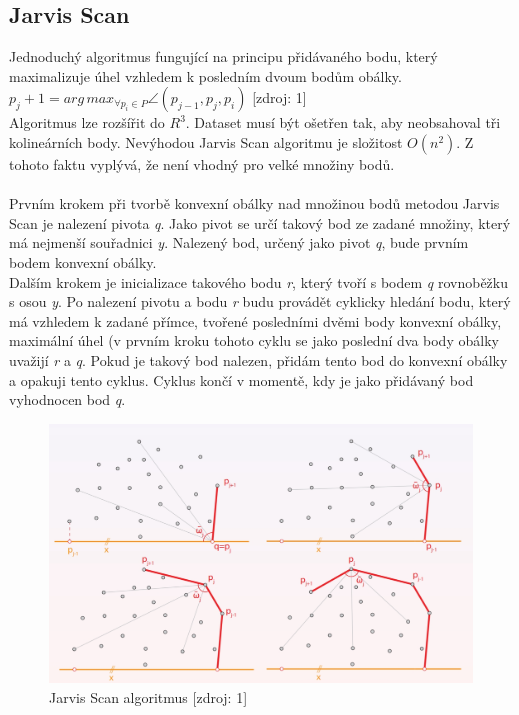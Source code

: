 \documentclass[a4paper, 12pt]{article}
\begin{document}
\subsection{Jarvis Scan}
Jednoduchý algoritmus fungující na principu přidávaného bodu, který maximalizuje úhel vzhledem k posledním dvoum bodům obálky. $ p_j+1 = arg\,max_{\forall p_i \in P}  \angle (p_{j-1}, p_j, p_i)$ [zdroj: 1]\\
Algoritmus lze rozšířit do $R^3$. Dataset musí být ošetřen tak, aby neobsahoval tři kolineárních body. Nevýhodou Jarvis Scan algoritmu je složitost $O(n^2)$. Z tohoto faktu vyplývá, že není vhodný pro velké množiny bodů. \\
\\
Prvním krokem při tvorbě konvexní obálky nad množinou bodů metodou Jarvis Scan je nalezení pivota \textit{q}. Jako pivot se určí takový bod ze zadané množiny, který má nejmenší souřadnici \textit{y}. Nalezený bod, určený jako pivot \textit{q}, bude prvním bodem konvexní obálky. \\
Dalším krokem je inicializace takového bodu \textit{r}, který tvoří s bodem \textit{q} rovnoběžku s osou \textit{y}.
Po nalezení pivotu a bodu \textit{r} budu provádět cyklicky hledání bodu, který má vzhledem k zadané přímce, tvořené posledními dvěmi body konvexní obálky, maximální úhel (v prvním kroku tohoto cyklu se jako poslední dva body obálky uvažijí \textit{r} a \textit{q}. Pokud je takový bod nalezen, přidám tento bod do konvexní obálky a opakuji tento cyklus. Cyklus končí v momentě, kdy je jako přidávaný bod vyhodnocen bod \textit{q}.\\

\begin{figure}[h!]
	\centering
	\includegraphics[width=12cm]{jarvis.jpg}
	\caption{Jarvis Scan algoritmus [zdroj: 1]}
\end{figure}
\end{document}
